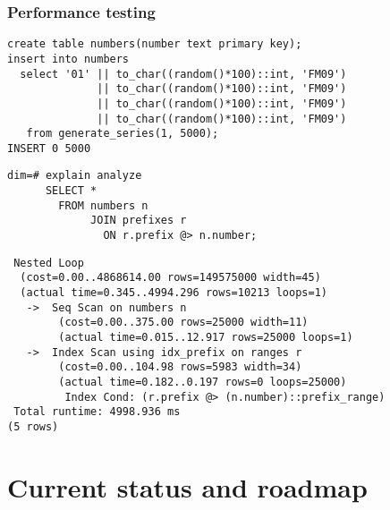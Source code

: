 \documentclass{beamer}
\begin{document}
\begin{frame}[fragile]
  \frametitle{Performance testing}

  \begin{example}

  \begin{overprint}

  \begin{verbatim}
create table numbers(number text primary key);
insert into numbers
  select '01' || to_char((random()*100)::int, 'FM09')
              || to_char((random()*100)::int, 'FM09')
              || to_char((random()*100)::int, 'FM09')
              || to_char((random()*100)::int, 'FM09')
   from generate_series(1, 5000);
INSERT 0 5000
  \end{verbatim}

  \begin{verbatim}
dim=# explain analyze 
      SELECT * 
        FROM numbers n 
             JOIN prefixes r 
               ON r.prefix @> n.number;
  \end{verbatim}

  \begin{verbatim}
 Nested Loop
  (cost=0.00..4868614.00 rows=149575000 width=45)
  (actual time=0.345..4994.296 rows=10213 loops=1)
   ->  Seq Scan on numbers n
        (cost=0.00..375.00 rows=25000 width=11)
        (actual time=0.015..12.917 rows=25000 loops=1)
   ->  Index Scan using idx_prefix on ranges r
        (cost=0.00..104.98 rows=5983 width=34)
        (actual time=0.182..0.197 rows=0 loops=25000)
         Index Cond: (r.prefix @> (n.number)::prefix_range)
 Total runtime: 4998.936 ms
(5 rows)
  \end{verbatim}

  \end{overprint}
  \end{example}
\end{frame}


\section{Current status and roadmap}
\end{document}
